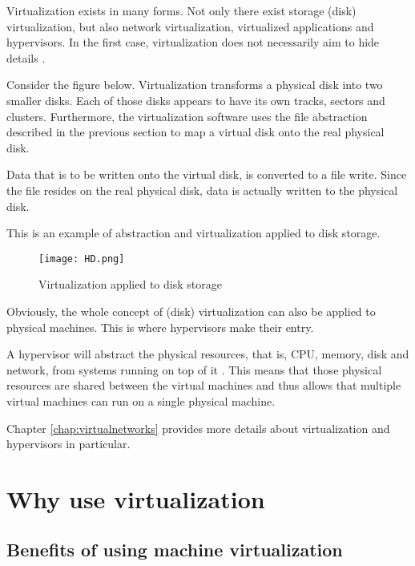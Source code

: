 Virtualization exists in many forms. Not only there exist storage (disk) virtualization, but also network virtualization, virtualized applications and hypervisors. In the first case, virtualization does not necessarily aim to hide details \citep{ArchVM}. 

Consider the figure below. Virtualization transforms a physical disk into two smaller disks. Each of those disks appears to have its own tracks, sectors and clusters. Furthermore, the virtualization software uses the file abstraction described in the previous section to map a virtual disk onto the real physical disk.

Data that is to be written onto the virtual disk, is converted to a file write. Since the file resides on the real physical disk, data is actually written to the physical disk.

This is an example of abstraction and virtualization applied to disk storage.
\begin{figure}[h]
    \centering
    \texttt{[image: HD.png]}
    \caption[Virtualization of hard disks]{Virtualization applied to disk storage}
\end{figure}
Obviously, the whole concept of (disk) virtualization can also be applied to physical machines. This is where hypervisors make their entry.

A hypervisor will abstract the physical resources, that is, CPU, memory, disk and network, from systems running on top of it \citep{VMIntro1}. This means that those physical resources are shared between the virtual machines and thus allows that multiple virtual machines can run on a single physical machine.

Chapter \ref{chap:virtualnetworks} provides more details about virtualization and hypervisors in particular.

\section{Why use virtualization}

\subsection{Benefits of using machine virtualization}

